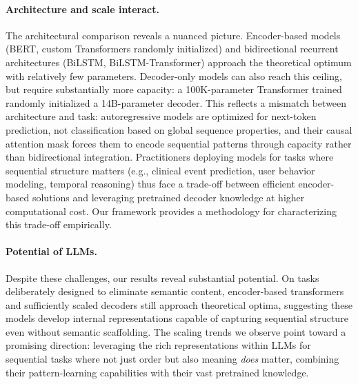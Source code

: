 \documentclass{article}
\theoremstyle{plain}
\theoremstyle{definition}
\theoremstyle{remark}
\begin{document}
\paragraph{Architecture and scale interact.}
The architectural comparison reveals a nuanced picture. Encoder-based models (BERT, custom Transformers randomly initialized) and bidirectional recurrent architectures (BiLSTM, BiLSTM-Transformer) approach the theoretical optimum with relatively few parameters. Decoder-only models can also reach this ceiling, but require substantially more capacity: a 100K-parameter Transformer trained randomly initialized a 14B-parameter decoder. This reflects a mismatch between architecture and task: autoregressive models are optimized for next-token prediction, not classification based on global sequence properties, and their causal attention mask forces them to encode sequential patterns through capacity rather than bidirectional integration. Practitioners deploying models for tasks where sequential structure matters (e.g., clinical event prediction, user behavior modeling, temporal reasoning) thus face a trade-off between efficient encoder-based solutions and leveraging pretrained decoder knowledge at higher computational cost. Our framework provides a methodology for characterizing this trade-off empirically.

\paragraph{Potential of LLMs.} Despite these challenges, our results reveal substantial potential. On tasks deliberately designed to eliminate semantic content, encoder-based transformers and sufficiently scaled decoders still approach theoretical optima, suggesting these models develop internal representations capable of capturing sequential structure even without semantic scaffolding. The scaling trends we observe point toward a promising direction: leveraging the rich representations within LLMs for sequential tasks where not just order but also meaning \emph{does} matter, combining their pattern-learning capabilities with their vast pretrained knowledge.
\end{document}
